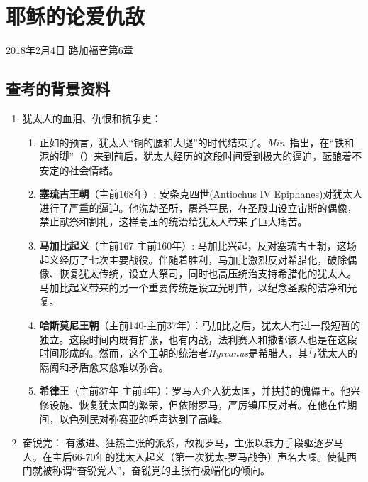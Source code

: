 \chapter{耶稣的论爱仇敌}

2018年2月4日 \hfill 路加福音第6章


\section{查考的背景资料}

\begin{enumerate}
  \item 犹太人的血泪、仇恨和抗争史：
  \begin{enumerate}
    \item 正如的预言，犹太人“铜的腰和大腿”的时代结束了。\textit{Min}~\cite{book:minMessiah}指出，在“铁和泥的脚”（）来到前后，犹太人经历的这段时间受到极大的逼迫，酝酿着不安定的社会情绪。
    \item \textbf{塞琉古王朝}（主前168年）: 安条克四世(Antiochus IV Epiphanes)对犹太人进行了严重的逼迫。他洗劫圣所，屠杀平民，在圣殿山设立宙斯的偶像，禁止献祭和割礼，这样高压的统治给犹太人带来了巨大痛苦。\cite{wiki:Maccabean, wiki:Hasmonean}
    \item \textbf{马加比起义}（主前167-主前160年）: 马加比兴起，反对塞琉古王朝，这场起义经历了七次主要战役。伴随着胜利，马加比激烈反对希腊化，破除偶像、恢复犹太传统，设立大祭司，同时也高压统治支持希腊化的犹太人\cite{wiki:Maccabean}。马加比起义带来的另一个重要传统是设立光明节\cite{wiki:Hanukkah}，以纪念圣殿的洁净和光复。
    \item \textbf{哈斯莫尼王朝}（主前140-主前37年）：马加比之后，犹太人有过一段短暂的独立。这段时间内既有扩张，也有内战，法利赛人和撒都该人也是在这段时间形成的。然而，这个王朝的统治者\textit{Hyrcanus}是希腊人，其与犹太人的隔阂和矛盾愈来愈难以弥合\cite{wiki:Hasmonean}。
    \item \textbf{希律王}（主前37年-主前4年）：罗马人介入犹太国，并扶持的傀儡王。他兴修设施、恢复犹太国的繁荣，但依附罗马，严厉镇压反对者。在他在位期间，以色列民对弥赛亚的呼声达到了高峰\cite{wiki:Hasmonean}。
  \end{enumerate}
  \item 奋锐党：
  有激进、狂热主张的派系，敌视罗马，主张以暴力手段驱逐罗马人。在主后66-70年的犹太人起义（第一次犹太-罗马战争）声名大噪。使徒西门就被称谓“奋锐党人”，奋锐党的主张有极端化的倾向。\cite{wiki:Zealots}
\end{enumerate}

